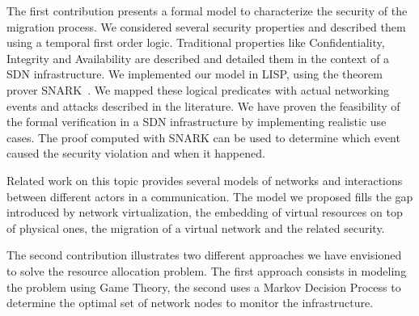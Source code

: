 The first contribution presents a formal model to characterize the security of the migration process. We considered several security properties and described them using a temporal first order logic. Traditional properties like Confidentiality, Integrity and Availability are described and detailed them in the context of a SDN infrastructure.
We implemented our model in LISP, using the theorem prover SNARK~\cite{snark-Stickel2000}.
We mapped these logical predicates with actual networking events and attacks described in the literature.
We have proven the feasibility of the formal verification in a SDN infrastructure by implementing realistic use cases.
The proof computed with SNARK can be used to determine which event caused the security violation and when it happened.

Related work on this topic provides several models of networks and interactions between different actors in a communication. The model we proposed fills the gap introduced by network virtualization, the embedding of virtual resources on top of physical ones, the migration of a virtual network and the related security. 

The second contribution illustrates two different approaches we have envisioned to solve the resource allocation problem. The first approach consists in modeling the problem using Game Theory, the second uses a Markov Decision Process to determine the optimal set of network nodes to monitor the infrastructure.


